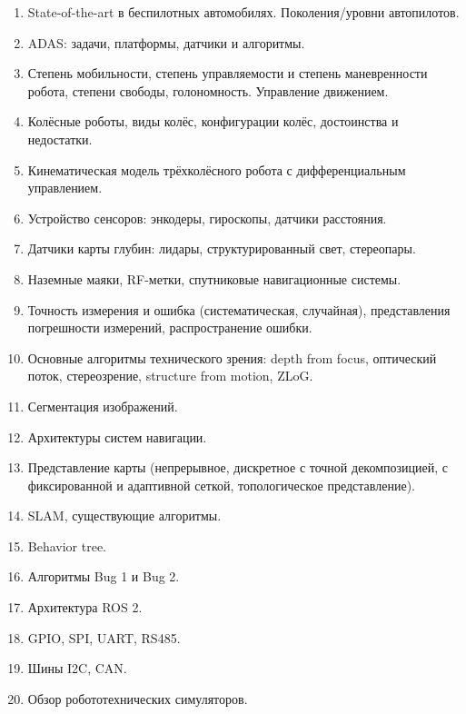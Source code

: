 \documentclass[a5paper]{article}
\begin{document}
\begin{enumerate}
    \item State-of-the-art в беспилотных автомобилях. Поколения/уровни автопилотов. 
    \item ADAS: задачи, платформы, датчики и алгоритмы.
    \item Степень мобильности, степень управляемости и степень маневренности робота, степени свободы, голономность. Управление движением.
    \item Колёсные роботы, виды колёс, конфигурации колёс, достоинства и недостатки.
    \item Кинематическая модель трёхколёсного робота с дифференциальным управлением.
    \item Устройство сенсоров: энкодеры, гироскопы, датчики расстояния.
    \item Датчики карты глубин: лидары, структурированный свет, стереопары.
    \item Наземные маяки, RF-метки, спутниковые навигационные системы.
    \item Точность измерения и ошибка (систематическая, случайная), представления погрешности измерений, распространение ошибки.
    \item Основные алгоритмы технического зрения: depth from focus, оптический поток, стереозрение, structure from motion, ZLoG.
    \item Сегментация изображений.
    \item Архитектуры систем навигации.
    \item Представление карты (непрерывное, дискретное с точной декомпозицией, с фиксированной и адаптивной сеткой, топологическое представление).
    \item SLAM, существующие алгоритмы.
    \item Behavior tree.
    \item Алгоритмы Bug 1 и Bug 2.
    \item Архитектура ROS 2.
    \item GPIO, SPI, UART, RS485.
    \item Шины I2C, CAN.
    \item Обзор робототехнических симуляторов.
\end{enumerate}
\end{document}
